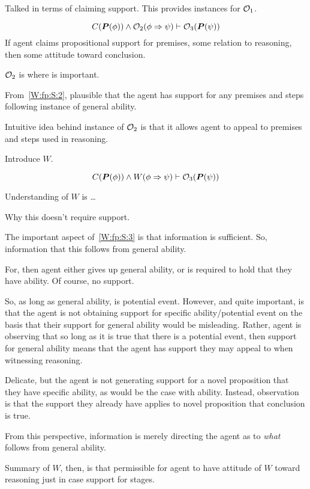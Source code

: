 \begin{note}
  Talked in terms of claiming support.
  This provides instances for \(\mathcal{O}_{1}\).

  \[C(\bm{P}(\phi)) \land \mathcal{O}_{2}(\phi \Rightarrow{} \psi) \vdash \mathcal{O}_{3}(\bm{P}(\psi))\]
  If agent claims propositional support for premises, some relation to reasoning, then some attitude toward conclusion.
\end{note}

\begin{note}[\(\geop{2}\)]
  \(\geop{2}\) is where \WR{} is important.

  From~\ref{W:fp:S:2}, plausible that the agent has support for any premises and steps following instance of general ability.

  Intuitive idea behind instance of \(\geop{2}\) is that it allows agent to appeal to premises and steps used in reasoning.

  Introduce \(W\).

  \[C(\bm{P}(\phi)) \land W(\phi \Rightarrow{} \psi) \vdash \mathcal{O}_{3}(\bm{P}(\psi))\]

  Understanding of \(W\) is \dots




  Why this doesn't require support.

  The important aspect of~\ref{W:fp:S:3} is that information is sufficient.
  So, information that this follows from general ability.

  For, then agent either gives up general ability, or is required to hold that they have ability.
  Of course, no support.

  So, as long as general ability, is potential event.
  However, and quite important, is that the agent is not obtaining support for specific ability/potential event on the basis that their support for general ability would be misleading.
  Rather, agent is observing that so long as it is true that there is a potential event, then support for general ability means that the agent has support they may appeal to when witnessing reasoning.

  Delicate, but the agent is not generating support for a novel proposition that they have specific ability, as would be the case with ability.
  Instead, observation is that the support they already have applies to novel proposition that conclusion is true.

  From this perspective, information is merely directing the agent as to \emph{what} follows from general ability.

  Summary of \(W\), then, is that permissible for agent to have attitude of \(W\) toward reasoning just in case support for stages.
\end{note}

